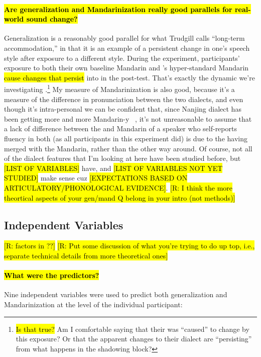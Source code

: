 \paragraph{\hl{Are generalization and Mandarinization really good parallels for real-world sound change?}} Generalization is a reasonably good parallel for what Trudgill \citeyearpar{trudgill1986dialects} calls ``long-term accommodation,'' in that it is an example of a persistent change in one's speech style after exposure to a different style. During the experiment, participants' exposure to both their own baseline Mandarin and \annie's hyper-standard Mandarin \hl{cause changes that persist} into in the \ND{} post-test. That's exactly the dynamic we're investigating \IRL.\footnote{\hl{Is that true?} Am I comfortable saying that their \ND{} was ``caused'' to change by this exposure? Or that the apparent changes to their dialect are ``persisting'' from what happens in the shadowing block?} My measure of Mandarinization is also good, because it's a measure of the difference in pronunciation between the two dialects, and even though it's intra-personal we can be confident that, since Nanjing dialect has been getting more and more Mandarin-y \IRL~\citep{bao1980sixty}, it's not unreasonable to assume that a lack of difference between the \ND{} and Mandarin of a speaker who self-reports fluency in both (as all participants in this experiment did) is due to the \ND{} having merged with the Mandarin, rather than the other way around. Of course, not all of the dialect features that I'm looking at here have been studied before, but \hl{[LIST OF VARIABLES]} have, and \hl{[LIST OF VARIABLES NOT YET STUDIED]} make sense cuz \hl{[EXPECTATIONS BASED ON ARTICULATORY/PHONOLOGICAL EVIDENCE]}. \hl{[R: I think the more theortical aspects of your gen/mand Q belong in your intro (not methods)]}

\subsection{Independent Variables}
\hl{[R: factors in ??]}
\hl{[R: Put some discussion of what you're trying to do up top, i.e., separate technical details from more theoretical ones]}

\paragraph{\hl{What were the predictors?}} Nine independent variables were used to predict both generalization and Mandarinization at the level of the individual participant:


